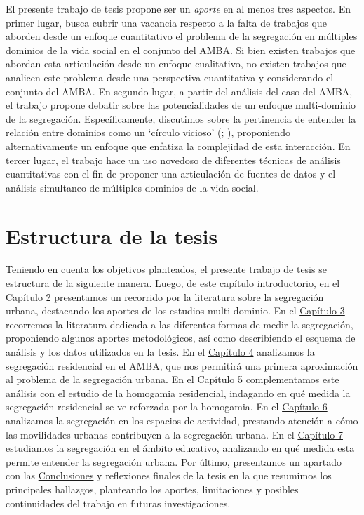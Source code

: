\documentclass[
  spanish,
  a4paper,%
  chapterprefix=true,%
  DIV=calc,%
  twoside]{scrbook}%
\begin{document}
El presente trabajo de tesis propone ser un \emph{aporte} en al menos tres
aspectos. En primer lugar, busca cubrir una vacancia respecto a la falta
de trabajos que aborden desde un enfoque cuantitativo el problema de la
segregación en múltiples dominios de la vida social en el conjunto del
AMBA. Si bien existen trabajos que abordan esta articulación desde un
enfoque cualitativo, no existen trabajos que analicen este problema
desde una perspectiva cuantitativa y considerando el conjunto del AMBA.
En segundo lugar, a partir del análisis del caso del AMBA, el trabajo
propone debatir sobre las potencialidades de un enfoque multi-dominio de
la segregación. Específicamente, discutimos sobre la pertinencia de
entender la relación entre dominios como un `círculo vicioso'
(; ), proponiendo alternativamente un enfoque que
enfatiza la complejidad de esta interacción. En tercer lugar, el trabajo
hace un uso novedoso de diferentes técnicas de análisis cuantitativas
con el fin de proponer una articulación de fuentes de datos y el
análisis simultaneo de múltiples dominios de la vida social.

\section{Estructura de la tesis}\label{estructura-de-la-tesis}

Teniendo en cuenta los objetivos planteados, el presente trabajo de
tesis se estructura de la siguiente manera. Luego, de este capítulo
introductorio, en el \hyperref[lit]{Capítulo 2} presentamos un recorrido por la
literatura sobre la segregación urbana, destacando los aportes de los
estudios multi-dominio. En el \hyperref[method]{Capítulo 3} recorremos la
literatura dedicada a las diferentes formas de medir la segregación,
proponiendo algunos aportes metodológicos, así como describiendo el
esquema de análisis y los datos utilizados en la tesis. En el \hyperref[residential]{Capítulo
4} analizamos la segregación residencial en el AMBA, que
nos permitirá una primera aproximación al problema de la segregación
urbana. En el \hyperref[homogamy]{Capítulo 5} complementamos este análisis con
el estudio de la homogamia residencial, indagando en qué medida la
segregación residencial se ve reforzada por la homogamia. En el
\hyperref[mobilities]{Capítulo 6} analizamos la segregación en los espacios de
actividad, prestando atención a cómo las movilidades urbanas contribuyen
a la segregación urbana. En el \hyperref[school]{Capítulo 7} estudiamos la
segregación en el ámbito educativo, analizando en qué medida esta
permite entender la segregación urbana. Por último, presentamos un
apartado con las \hyperref[conclussion]{Conclusiones} y reflexiones finales de
la tesis en la que resumimos los principales hallazgos, planteando los
aportes, limitaciones y posibles continuidades del trabajo en futuras
investigaciones.
\end{document}
